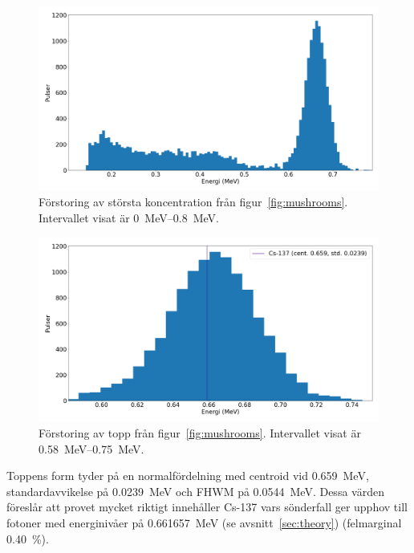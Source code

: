 \begin{figure}[!hp]
    \centering
    \includegraphics[width=\textwidth, keepaspectratio]{../images/mushrooms_zoom.png}
    \caption{
        Förstoring av största koncentration från figur~\ref{fig:mushrooms}.
        Intervallet visat är \qtyrange{0}{0.8}{\MeV}.
    }
    \label{fig:mushroomszoom}
\end{figure}

\begin{figure}[!hp]
    \centering
    \includegraphics[width=\textwidth, keepaspectratio]{../images/mushrooms_top.png}
    \caption{
        Förstoring av topp från figur~\ref{fig:mushrooms}.
        Intervallet visat är \qtyrange{0.58}{0.75}{\MeV}.
    }
    \label{fig:mushroomstop}
\end{figure}

Toppens form tyder på en normalfördelning med centroid vid \qty{0.659}{\MeV},
standardavvikelse på \qty{0.0239}{\MeV} och FHWM på \qty{0.0544}{\MeV}. Dessa
värden föreslår att provet mycket riktigt innehåller Cs-137 vars sönderfall ger
upphov till fotoner med energinivåer på \qty{0.661657}{\MeV} (se
avsnitt~\ref{sec:theory}) (felmarginal \qty{0.40}{\percent}).

